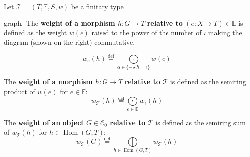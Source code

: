    
   \begin{definition} 
       \label{def:weight}
       Let $\mathcal{T} \mathop{=} (T,\mathbb{E},S, w)$ be a finitary type
       \newline
       \noindent
       \begin{minipage}{0.6\textwidth}graph.~The \textbf{weight of a morphism $h: G \mathop{\rightarrow} T$ relative to $(e:X \mathop{\to} T) \mathop{\in} \mathbb{E}$} is defined as the weight $w(e)$ raised to the power of the number of $\iota$ making the diagram (shown on the right) commutative.
       \end{minipage}
       \begin{minipage}{0.29\textwidth}
           \begin{center}
           \end{center} 
       \end{minipage}
                   \[
                   w_e(h) 
                       \overset{\operatorname{def}}{=}
                   \underset{\alpha \mathop{\in} \{- \mathop{\star} h \mathop{=} e\}}{\mathop{\bigodot}}w(e) 
                   \]
   
           \noindent
           The \textbf{weight of a morphism $h: G \mathop{\rightarrow} T$ relative to \(\mathcal{T}\)} is defined as the semiring product of $w(e)$ for $e \mathop{\in} \mathbb{E}$:
           \[  w_\mathcal{T}(h) \overset{\operatorname{def}}{=} \underset{e \mathop{\in} \mathbb{E}}{\mathop{\bigodot}} 
                   w_e(h) \]
   
           \noindent
          The \textbf{weight of an object \( G \mathop{\in} \mathcal{C}_0 \) relative to \( \mathcal{T}\)} is defined as the semiring sum of $w_\mathcal{T}(h)$ for $h \mathop{\in} \operatorname{Hom}(G,T)$:
           \[w_\mathcal{T}(G) \overset{\operatorname{def}}{=} \underset{h \mathop{\in} \operatorname{Hom}(G,T)}{\mathop{\bigoplus}}  w_\mathcal{T}(h) \]
   \end{definition}
   
